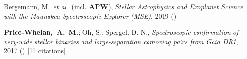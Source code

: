 \item[{\color{deemph}\scriptsize2}]Bergemann, M.~\textit{et al.}~(incl. \textbf{APW}), \textit{Stellar Astrophysics and Exoplanet Science with the Maunakea Spectroscopic Explorer (MSE)}, 2019 ()

\item[{\color{deemph}\scriptsize1}]\textbf{Price-Whelan,~A.~M.}; Oh, S.; Spergel, D. N., \textit{Spectroscopic confirmation of very-wide stellar binaries and large-separation comoving pairs from Gaia DR1}, 2017 () [\href{http://adsabs.harvard.edu/abs/2017arXiv170903532P}{11 citations}]